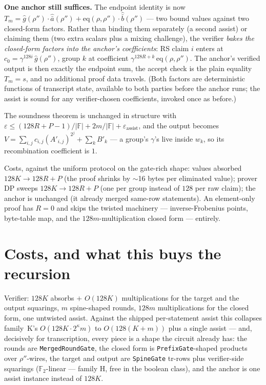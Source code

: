\documentclass[11pt]{article}
\newcommand{\F}{\mathbb{F}}
\newcommand{\eq}{\mathrm{eq}}
\newcommand{\code}[1]{\texttt{#1}}
\begin{document}
\textbf{One anchor still suffices.} The endpoint identity is now
$T_m = \hat g(\rho'')\cdot\hat{\bar a}(\rho'') +
\eq(\rho,\rho'')\cdot\hat{\bar b}(\rho'')$ — two bound values against two
closed-form factors. Rather than binding them separately (a second
assist) or claiming them (two extra scalars plus a mixing challenge),
the verifier \emph{bakes the closed-form factors into the anchor's
coefficients}: RS claim $i$ enters at $c_0 = \gamma^{128 i}\,\hat
g(\rho'')$, group $k$ at coefficient $\gamma^{128R + k}\,\eq(\rho,\rho'')$.
The anchor's verified output is then exactly the endpoint sum, the
accept check is the plain equality $T_m = s$, and no additional proof
data travels. (Both factors are deterministic functions of transcript
state, available to both parties before the anchor runs; the assist is
sound for any verifier-chosen coefficients, invoked once as before.)

The soundness theorem is unchanged in structure with
$\varepsilon \le (128R + P - 1)/|\F| + 2m/|\F| +
\varepsilon_{\mathrm{assist}}$, and the output becomes
$V = \sum_{i,j} c_{i,j} (A'_{i,j})^{2^j} + \sum_k B'_k$ — a group's
$\gamma$'s live inside $w_k$, so its recombination coefficient is $1$.

Costs, against the uniform protocol on the gate-rich shape: values
absorbed $128K \to 128R + P$ (the proof shrinks by $\sim$16 bytes per
eliminated value); prover DP sweeps $128K \to 128R + P$ (one per group
instead of $128$ per raw claim); the anchor is unchanged (it already
merged same-row statements). An element-only proof has $R = 0$ and
skips the twisted machinery — inverse-Frobenius points, byte-table
map, and the $128m$-multiplication closed form — entirely.

\section{Costs, and what this buys the recursion}

Verifier: $128K$ absorbs $+$ $O(128K)$ multiplications for the target and
the output squarings, $m$ spine-shaped rounds, $128m$ multiplications for
the closed form, one untwisted assist. Against the shipped per-statement
assist this collapses family~K's $O(128K \cdot 2^\kappa m)$ to
$O(128(K{+}m))$ plus a single assist — and, decisively for transcription,
every piece is a shape the circuit already has: the rounds are
\code{MergedRoundGate}, the closed form is \code{PrefixGate}-shaped products
over $\rho''$-wires, the target and output are \code{SpineGate} tr-rows plus
verifier-side squarings ($\F_2$-linear — family H, free in the boolean
class), and the anchor is one assist instance instead of $128K$.
\end{document}
